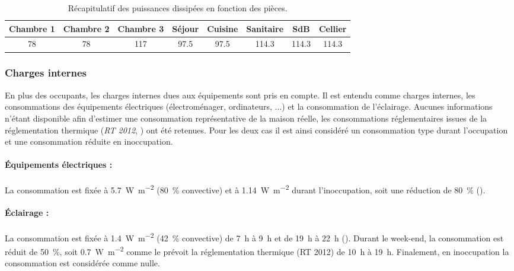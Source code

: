 
\begin{table}
\begin{tabular}{*8{c}}
    \toprule
    Chambre 1 & Chambre 2  & Chambre 3 & Séjour & Cuisine & Sanitaire & SdB   & Cellier \\
    \midrule
    78        & 78         & 117       & 97.5   & 97.5    & 114.3     & 114.3 & 114.3   \\
    \bottomrule
\end{tabular}
\caption{Récapitulatif des puissances dissipées en fonction des pièces.}
\label{tab:puissance_occupants}
\end{table}


\subsubsection{Charges internes} %
\label{ssub:charges_internes}
En plus des occupants, les charges internes dues aux équipements sont pris en compte.
Il est entendu comme charges internes, les consommations des équipements électriques
(électroménager, ordinateurs, ...) et la consommation de l’éclairage. Aucunes informations
n’étant disponible afin d’estimer une consommation représentative de la maison réelle,
les consommations réglementaires issues de la réglementation thermique (\emph{RT 2012}, \cite{CSTB2011})
ont été retenues. Pour les deux cas il est ainsi considéré un consommation type durant
l’occupation et une consommation réduite en inoccupation.

\paragraph{Équipements électriques :} %
\label{par:equipements_electriques}
La consommation est fixée à \SI{5.7}{\watt\per m^{2}} (\SI{80}{\percent}
convective) et à \SI{1.14}{\watt\per m^{2}} durant l’inoccupation, soit une
réduction de \SI{80}{\percent} ().

\paragraph{Éclairage :} %
\label{par:eclairage}
La consommation est fixée à \SI{1.4}{\watt\per m^{2}} (\SI{42}{\percent}
convective) de \SI{7}{\hour} à \SI{9}{\hour} et de \SI{19}{\hour} à \SI{22}{\hour}
(). Durant le week-end, la consommation est réduit de \SI{50}{\percent},
soit
\SI{0.7}{\watt\per m^{2}} comme le prévoit la réglementation thermique (RT 2012)
de \SI{10}{\hour} à \SI{19}{\hour}. Finalement, en inoccupation la consommation est
considérée comme nulle.

